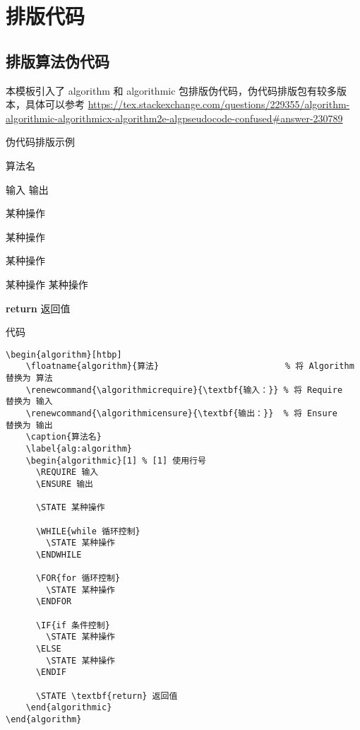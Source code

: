 \section{排版代码}

\subsection{排版算法伪代码}

本模板引入了 algorithm 和 algorithmic 包排版伪代码，伪代码排版包有较多版本，具体可以参考 \url{https://tex.stackexchange.com/questions/229355/algorithm-algorithmic-algorithmicx-algorithm2e-algpseudocode-confused#answer-230789}

伪代码排版示例

\begin{algorithm}[htbp]
    \renewcommand{\algorithmicrequire}{\textbf{输入：}} %
    \renewcommand{\algorithmicensure}{\textbf{输出：}}  %
    \caption{算法名}
    \label{alg:algorithm}
    \begin{algorithmic}[1] %
      \REQUIRE 输入
      \ENSURE 输出

      \STATE 某种操作

        \STATE 某种操作
      \ENDWHILE

        \STATE 某种操作
      \ENDFOR

        \STATE 某种操作
      \ELSE
        \STATE 某种操作
      \ENDIF

      \STATE \textbf{return} 返回值
    \end{algorithmic}
\end{algorithm}

代码

\begin{lstlisting}[breaklines=true,]
\begin{algorithm}[htbp]
    \floatname{algorithm}{算法}                         % 将 Algorithm 替换为 算法
    \renewcommand{\algorithmicrequire}{\textbf{输入：}} % 将 Require   替换为 输入
    \renewcommand{\algorithmicensure}{\textbf{输出：}}  % 将 Ensure    替换为 输出
    \caption{算法名}
    \label{alg:algorithm}
    \begin{algorithmic}[1] % [1] 使用行号
      \REQUIRE 输入
      \ENSURE 输出

      \STATE 某种操作

      \WHILE{while 循环控制}
        \STATE 某种操作
      \ENDWHILE

      \FOR{for 循环控制}
        \STATE 某种操作
      \ENDFOR

      \IF{if 条件控制}
        \STATE 某种操作
      \ELSE
        \STATE 某种操作
      \ENDIF

      \STATE \textbf{return} 返回值
    \end{algorithmic}
\end{algorithm}
\end{lstlisting}

